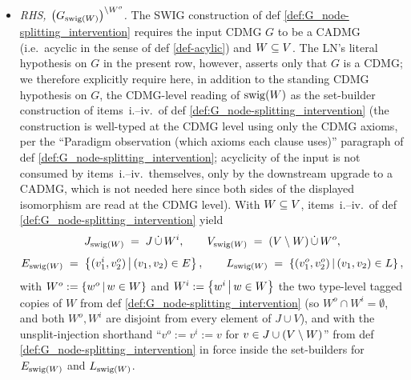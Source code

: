 \documentclass[main]{subfiles}
\begin{document}
\begin{Lem}
\begin{itemize}
        \item \emph{RHS, $\left ( G_{\mathrm{swig}(W)} \right )^{\setminus W^o}$.}
              The SWIG construction of def \ref{def:G_node-splitting_intervention} requires the input CDMG $G$ to be a CADMG (i.e.\ acyclic in the sense of def \ref{def-acylic}) and $W \subseteq V$. The LN's literal hypothesis on $G$ in the present row, however, asserts only that $G$ is a CDMG; we therefore explicitly require here, in addition to the standing CDMG hypothesis on $G$, the CDMG-level reading of $\mathrm{swig}(W)$ as the set-builder construction of items~i.--iv.\ of def \ref{def:G_node-splitting_intervention} (the construction is well-typed at the CDMG level using only the CDMG axioms, per the ``Paradigm observation (which axioms each clause uses)'' paragraph of def \ref{def:G_node-splitting_intervention}; acyclicity of the input is not consumed by items~i.--iv.\ themselves, only by the downstream upgrade to a CADMG, which is not needed here since both sides of the displayed isomorphism are read at the CDMG level). With $W \subseteq V$, items~i.--iv.\ of def \ref{def:G_node-splitting_intervention} yield
              \[
                  J_{\mathrm{swig}(W)} \;=\; J \,\dot{\cup}\, W^i,
                  \qquad
                  V_{\mathrm{swig}(W)} \;=\; (V \setminus W) \,\dot{\cup}\, W^o,
              \]
              \[
                  E_{\mathrm{swig}(W)} \;=\; \left \{ (v_1^i, v_2^o) \,\middle|\, (v_1, v_2) \in E \right \},
                  \qquad
                  L_{\mathrm{swig}(W)} \;=\; \left \{ (v_1^o, v_2^o) \,\middle|\, (v_1, v_2) \in L \right \},
              \]
              with $W^o := \left \{ w^o \,\middle|\, w \in W \right \}$ and $W^i := \left \{ w^i \,\middle|\, w \in W \right \}$ the two type-level tagged copies of $W$ from def \ref{def:G_node-splitting_intervention} (so $W^o \cap W^i = \emptyset$, and both $W^o, W^i$ are disjoint from every element of $J \cup V$), and with the unsplit-injection shorthand ``$v^o := v^i := v$ for $v \in J \cup (V \setminus W)$'' from def \ref{def:G_node-splitting_intervention} in force inside the set-builders for $E_{\mathrm{swig}(W)}$ and $L_{\mathrm{swig}(W)}$.


\end{itemize}
\end{Lem}
\end{document}
